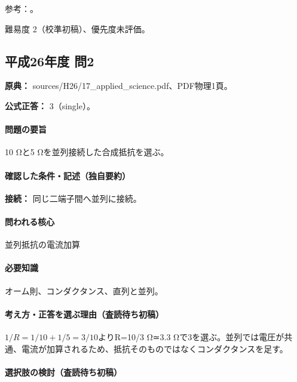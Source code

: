 \par 参考：\cite{mit_em07}。

\par 難易度 2（校準初稿）、優先度未評価。

\subsection{平成26年度 問2}
\label{q:h26-reg-applied-02}

\noindent\textbf{原典：} sources/H26/17\_applied\_science.pdf、PDF物理1頁。

\textbf{公式正答：} 3（single）。

\paragraph{問題の要旨} 10 Ωと5 Ωを並列接続した合成抵抗を選ぶ。

\paragraph{確認した条件・記述（独自要約）}\mbox{}\par

\noindent\textbf{接続：} 同じ二端子間へ並列に接続。\par

\paragraph{問われる核心} 並列抵抗の電流加算

\paragraph{必要知識} オーム則、コンダクタンス、直列と並列。

\paragraph{考え方・正答を選ぶ理由（査読待ち初稿）} \(1/R=1/10+1/5=3/10\)よりR=\allowbreak{}10/3 Ω≃3.3 Ωで3を選ぶ。並列では電圧が共通、電流が加算されるため、抵抗そのものではなくコンダクタンスを足す。

\paragraph{選択肢の検討（査読待ち初稿）}\mbox{}\par

